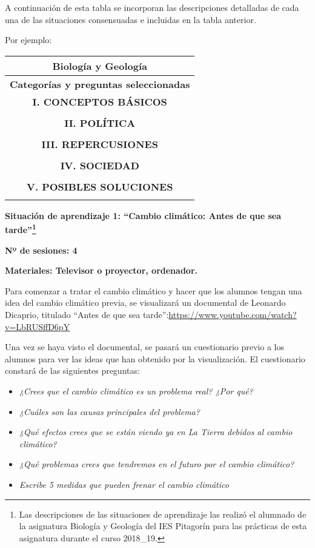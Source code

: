 \documentclass[
]{article}
\providecommand{\tightlist}{%
  \setlength{\itemsep}{0pt}\setlength{\parskip}{0pt}}
\begin{document}
A continuación de esta tabla se incorporan las descripciones detalladas
de cada una de las situaciones consensuadas e incluidas en la tabla
anterior.

Por ejemplo:

\begin{longtable}[]{@{}c@{}}
\toprule
\textbf{Biología y Geología} \\
\midrule
\endhead
\textbf{Categorías y preguntas seleccionadas} \\
\textbf{I. CONCEPTOS BÁSICOS} \\
 \\
\textbf{II. POLÍTICA} \\
 \\
\textbf{III. REPERCUSIONES} \\
 \\
\textbf{IV. SOCIEDAD} \\
 \\
\textbf{V. POSIBLES SOLUCIONES} \\
 \\
\bottomrule
\end{longtable}

\textbf{Situación de aprendizaje 1: ``Cambio climático: Antes de que sea
tarde''\footnote{Las descripciones de las situaciones de aprendizaje las
  realizó el alumnado de la asignatura Biología y Geología del IES
  Pitagorín para las prácticas de esta asignatura durante el curso
  2018\_19.}}

\textbf{Nº de sesiones: 4}

\textbf{Materiales: Televisor o proyector, ordenador.}

Para comenzar a tratar el cambio climático y hacer que los alumnos
tengan una idea del cambio climático previa, se visualizará un
documental de Leonardo Dicaprio, titulado ``Antes de que sea
tarde'':\href{https://www.youtube.com/watch?v=LbRUSffD6pY}{}\url{https://www.youtube.com/watch?v=LbRUSffD6pY}

\href{https://www.youtube.com/watch?v=LbRUSffD6pY}{}Una vez se haya
visto el documental, se pasará un cuestionario previo a los alumnos para
ver las ideas que han obtenido por la visualización. El cuestionario
constará de las siguientes preguntas:

\begin{itemize}
\tightlist
\item
  \emph{¿Crees que el cambio climático es un problema real? ¿Por qué?}
\item
  \emph{¿Cuáles son las causas principales del problema?}
\item
  \emph{¿Qué efectos crees que se están viendo ya en La Tierra debidos
  al cambio climático?}
\item
  \emph{¿Qué problemas crees que tendremos en el futuro por el cambio
  climático?}
\item
  \emph{Escribe 5 medidas que pueden frenar el cambio climático}
\end{itemize}
\end{document}
